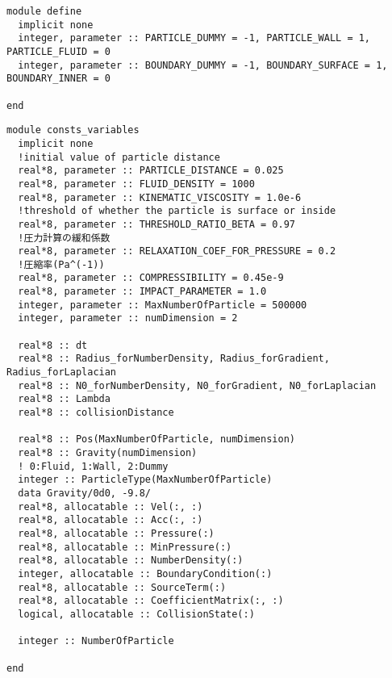 \begin{lstlisting}[caption=定義値]
module define
  implicit none
  integer, parameter :: PARTICLE_DUMMY = -1, PARTICLE_WALL = 1, PARTICLE_FLUID = 0
  integer, parameter :: BOUNDARY_DUMMY = -1, BOUNDARY_SURFACE = 1, BOUNDARY_INNER = 0

end
\end{lstlisting}
\begin{lstlisting}[caption=定数・変数の宣言]
module consts_variables
  implicit none
  !initial value of particle distance
  real*8, parameter :: PARTICLE_DISTANCE = 0.025
  real*8, parameter :: FLUID_DENSITY = 1000
  real*8, parameter :: KINEMATIC_VISCOSITY = 1.0e-6
  !threshold of whether the particle is surface or inside
  real*8, parameter :: THRESHOLD_RATIO_BETA = 0.97
  !圧力計算の緩和係数
  real*8, parameter :: RELAXATION_COEF_FOR_PRESSURE = 0.2
  !圧縮率(Pa^(-1))
  real*8, parameter :: COMPRESSIBILITY = 0.45e-9
  real*8, parameter :: IMPACT_PARAMETER = 1.0
  integer, parameter :: MaxNumberOfParticle = 500000
  integer, parameter :: numDimension = 2

  real*8 :: dt
  real*8 :: Radius_forNumberDensity, Radius_forGradient, Radius_forLaplacian
  real*8 :: N0_forNumberDensity, N0_forGradient, N0_forLaplacian
  real*8 :: Lambda
  real*8 :: collisionDistance

  real*8 :: Pos(MaxNumberOfParticle, numDimension)
  real*8 :: Gravity(numDimension)
  ! 0:Fluid, 1:Wall, 2:Dummy
  integer :: ParticleType(MaxNumberOfParticle)
  data Gravity/0d0, -9.8/
  real*8, allocatable :: Vel(:, :)
  real*8, allocatable :: Acc(:, :)
  real*8, allocatable :: Pressure(:)
  real*8, allocatable :: MinPressure(:)
  real*8, allocatable :: NumberDensity(:)
  integer, allocatable :: BoundaryCondition(:)
  real*8, allocatable :: SourceTerm(:)
  real*8, allocatable :: CoefficientMatrix(:, :)
  logical, allocatable :: CollisionState(:)

  integer :: NumberOfParticle

end
\end{lstlisting}